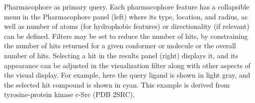 \label{pharmfig} 
Pharmacophore as primary query. Each pharmacophore feature has a collapsible menu in the Pharmacophore panel (left) where its type, location, and radius, as well as number of atoms (for hydrophobic features) or directionality (if relevant) can be defined. Filters may be set to reduce the number of hits, by constraining the number of hits returned for a given conformer or molecule or the overall number of hits. Selecting a hit in the results panel (right) displays it, and its appearance can be adjusted in the visualization filter along with other aspects of the visual display.  For example, here the query ligand is shown in light gray, and the selected hit compound is shown in cyan. This example is derived from tyrosine-protein kinase c-Src (PDB 2SRC).
